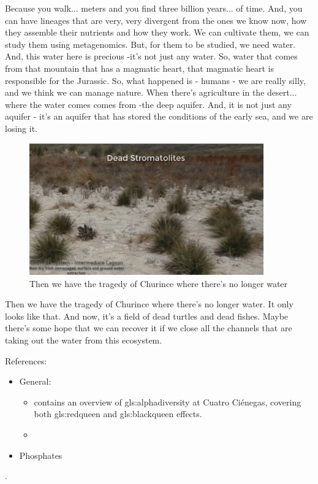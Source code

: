 \documentclass[]{article}
\begin{document}
Because you walk... meters and you find three billion years... of time. And, you can have lineages that are very, very divergent from the ones we know now, how they assemble their nutrients and how they work. We can cultivate them, we can study them using metagenomics. But, for them to be studied, we need water. And, this water here is precious -it's not just any water. So, water that comes from that mountain that has a magmatic heart, that magmatic heart is responsible for the Jurassic. So, what happened is - humans - we are really silly, and we think we can manage nature. When there's agriculture in the desert... where the water comes comes from -the deep aquifer. And, it is not just any aquifer - it's an aquifer that has stored the conditions of the early sea, and we are losing it.

\begin{figure}[H]
	\caption[The tragedy of Churince where there's no longer water]{Then we have the tragedy of Churince where there's no longer water} 
	\includegraphics[width=0.9\textwidth]{CuatroCienegas11}
\end{figure}

Then we have the tragedy of Churince where there's no longer water. It only looks like that. And now, it's a field of dead turtles and dead fishes. Maybe there's some hope that we can recover it if we close all the channels that are taking out the water from this ecosystem.

References:  \begin{itemize}
	\item General:
\begin{itemize}
	\item \cite{souza2018lost} contains an overview of \gls{gls:alphadiversity} at Cuatro  Ci\'enegas, covering both \gls{gls:redqueen} and \gls{gls:blackqueen} effects.
	 \item \cite{perezortega2020pools,valdivia2016variability,gomez2018leptolyngbya,taboada2018geographic}
\end{itemize}
	\item Phosphates \cite{hao2020cycling,elser2006early}
\end{itemize}.
\end{document}
